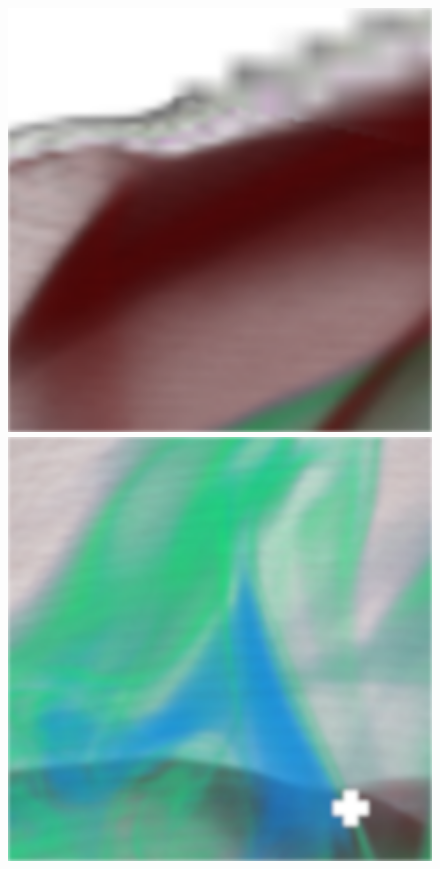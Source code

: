 \begin{figure}[]
	\centering
	\begin{minipage}[t]{0.3\textwidth}
		\centering
		\includegraphics[width=1\textwidth]{../../Neue_Messungen/Supernova/cut/ddc/ddc_1.png}
	\end{minipage}
	\hfill
	\begin{minipage}[t]{0.3\textwidth}
		\centering
		\includegraphics[width=1\textwidth]{../../Neue_Messungen/Supernova/cut/ddc/ddc_2.png}

\end{minipage}
\end{figure}
